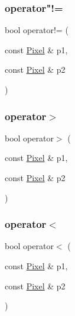 \mbox{\label{class_pixel_aaa61dbcbc3587ecba5a49edb8362c311}} 
\subsubsection{\texorpdfstring{operator"!=}{operator!=}}
{\footnotesize\ttfamily bool operator!= (\begin{DoxyParamCaption}\item[{const \mbox{\hyperlink{class_pixel}{Pixel}} \&}]{p1,  }\item[{const \mbox{\hyperlink{class_pixel}{Pixel}} \&}]{p2 }\end{DoxyParamCaption})\hspace{0.3cm}{\ttfamily [friend]}}

\mbox{\label{class_pixel_a0ab6a49b7ff1d8f9af27154d09d89352}} 
\subsubsection{\texorpdfstring{operator$>$}{operator>}}
{\footnotesize\ttfamily bool operator$>$ (\begin{DoxyParamCaption}\item[{const \mbox{\hyperlink{class_pixel}{Pixel}} \&}]{p1,  }\item[{const \mbox{\hyperlink{class_pixel}{Pixel}} \&}]{p2 }\end{DoxyParamCaption})\hspace{0.3cm}{\ttfamily [friend]}}

\mbox{\label{class_pixel_a6cc03ea69b84151454e6cb42b066f3c6}} 
\subsubsection{\texorpdfstring{operator$<$}{operator<}}
{\footnotesize\ttfamily bool operator$<$ (\begin{DoxyParamCaption}\item[{const \mbox{\hyperlink{class_pixel}{Pixel}} \&}]{p1,  }\item[{const \mbox{\hyperlink{class_pixel}{Pixel}} \&}]{p2 }\end{DoxyParamCaption})\hspace{0.3cm}{\ttfamily [friend]}}

